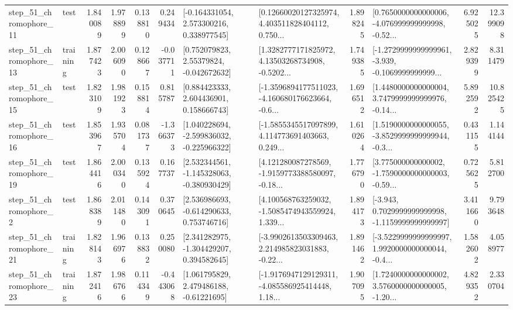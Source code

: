 \begin{tabular}{llrrrrllrlrr}
   step\_51\_chromophore\_11 &      test &      1.840089 &    1.978899 &      0.138810 &  0.249434 &    [-0.164331054, 2.573300216, 0.338977545] &  [0.12660020127325974, 4.403511828404112, 0.750... &       1.898245 &  [0.7650000000000006, -4.076999999999998, -0.52... &            6.925025 &         12.399098 \\
   step\_51\_chromophore\_13 &  training &      1.877423 &    2.006090 &      0.128667 & -0.037711 &     [0.752079823, 2.55379824, -0.042672632] &  [1.3282777171825972, 4.13503268734908, -0.5202... &       1.749385 &  [-1.2729999999999961, -3.939, -0.1069999999999... &            2.829399 &          8.311479 \\
   step\_51\_chromophore\_15 &      test &      1.823109 &    1.981923 &      0.158814 &  0.815787 &     [0.884423333, 2.604436901, 0.158666743] &  [-1.3596894177511023, -4.160680176623664, -0.6... &       1.696512 &  [1.4480000000000004, 3.7479999999999976, -0.14... &            5.892592 &         10.825425 \\
   step\_51\_chromophore\_16 &      test &      1.853967 &    1.935704 &      0.081737 & -1.366373 &   [1.040228694, -2.599836032, -0.225966322] &  [-1.5855345517097899, 4.114773691403663, 0.249... &       1.610264 &  [1.5190000000000055, -3.8529999999999944, -0.3... &            0.431155 &          1.144144 \\
   step\_51\_chromophore\_19 &      test &      1.864416 &    2.000340 &      0.135924 &  0.167737 &   [2.532344561, -1.145328063, -0.380930429] &  [4.121280087278569, -1.9159773388580097, -0.18... &       1.776790 &  [3.775000000000002, -1.7590000000000003, -0.59... &            0.725625 &          5.812700 \\
    step\_51\_chromophore\_2 &      test &      1.868389 &    2.011480 &      0.143091 &  0.370645 &    [2.536986693, -0.614290633, 0.753746716] &  [4.100568763259032, -1.5085474943559924, 1.339... &       1.894173 &  [-3.943, 0.7029999999999998, -1.1159999999999997] &            3.411660 &          9.793648 \\
   step\_51\_chromophore\_21 &  training &      1.828143 &    1.966976 &      0.138832 &  0.250080 &    [2.341282975, -1.304429207, 0.394582645] &  [-3.9902613503309463, 2.214985823031883, -0.22... &       1.891462 &  [-3.5229999999999997, 1.9920000000000044, -0.4... &            1.582602 &          4.058977 \\
   step\_51\_chromophore\_23 &  training &      1.872416 &    1.986766 &      0.114349 & -0.443068 &     [1.061795829, 2.479486188, -0.61221695] &  [-1.9176947129129311, -4.085586925414448, 1.18... &       1.907095 &  [1.7240000000000002, 3.5760000000000005, -1.20... &            4.829352 &          2.330704 \\

\end{tabular}
